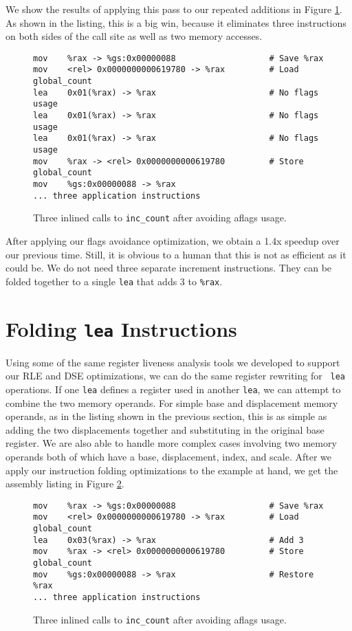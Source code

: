 We show the results of applying this pass to our repeated additions in Figure
\ref{fig:inscount_flags}.  As shown in the listing, this is a big win, because
it eliminates three instructions on both sides of the call site as well as two
memory accesses.

\begin{figure}
\begin{verbatim}
mov    %rax -> %gs:0x00000088                   # Save %rax
mov    <rel> 0x0000000000619780 -> %rax         # Load global_count
lea    0x01(%rax) -> %rax                       # No flags usage
lea    0x01(%rax) -> %rax                       # No flags usage
lea    0x01(%rax) -> %rax                       # No flags usage
mov    %rax -> <rel> 0x0000000000619780         # Store global_count
mov    %gs:0x00000088 -> %rax 
... three application instructions
\end{verbatim}
\caption{Three inlined calls to {\tt inc\_count} after avoiding aflags usage.}
\label{fig:inscount_flags}
\end{figure}

After applying our flags avoidance optimization, we obtain a 1.4x speedup over
our previous time.  Still, it is obvious to a human that this is not as
efficient as it could be.  We do not need three separate increment instructions.
They can be folded together to a single {\tt lea} that adds 3 to {\tt \%rax}.

\section{Folding {\tt lea} Instructions}
\label{sec:fold_lea}

Using some of the same register liveness analysis tools we developed to support
our RLE and DSE optimizations, we can do the same register rewriting for {\tt
lea} operations.  If one {\tt lea} defines a register used in another {\tt lea},
we can attempt to combine the two memory operands.  For simple base and
displacement memory operands, as in the listing shown in the previous section,
this is as simple as adding the two displacements together and substituting in
the original base register.  We are also able to handle more complex cases
involving two memory operands both of which have a base, displacement, index,
and scale.  After we apply our instruction folding optimizations to the example
at hand, we get the assembly listing in Figure \ref{fig:inscount_lea}.

\begin{figure}
\begin{verbatim}
mov    %rax -> %gs:0x00000088                   # Save %rax
mov    <rel> 0x0000000000619780 -> %rax         # Load global_count
lea    0x03(%rax) -> %rax                       # Add 3
mov    %rax -> <rel> 0x0000000000619780         # Store global_count
mov    %gs:0x00000088 -> %rax                   # Restore %rax
... three application instructions
\end{verbatim}
\caption{Three inlined calls to {\tt inc\_count} after avoiding aflags usage.}
\label{fig:inscount_lea}
\end{figure}

